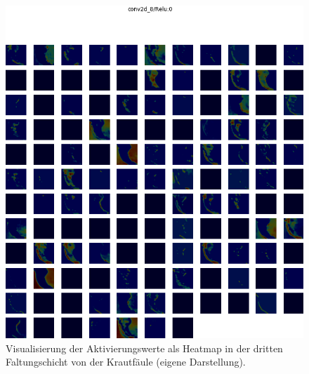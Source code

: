 \begin{figure}[h!]
	\centering
	\includegraphics[width=\textwidth]{visualisierungen/late/heatmap_mit/conv2d_8.png}
	\caption{Visualisierung der Aktivierungswerte als Heatmap in der dritten Faltungschicht von der Krautfäule (eigene Darstellung).}
	\label{}
\end{figure}

